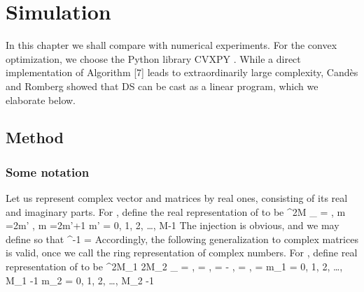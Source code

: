 \chapter {Simulation}

In this chapter we shall compare  with numerical experiments.
For the convex optimization, we choose the Python library CVXPY \cite {DiB16}.
While a direct implementation of Algorithm [7] leads to extraordinarily large complexity, Candès and Romberg \cite {CaR05} showed that DS can be cast as a linear program, which we elaborate below.

\section {Method}

\subsection {Some notation}

Let us represent complex vector and matrices by real ones, consisting of its real and imaginary parts.
For , define the real representation  of  to be
%
 {
 
\in {} ^{2M} \NR
{}  _{}
= \startcases
{} , \MC m =2m' \NR
{} , \MC m =2m'+1 \NR
\stopcases \NR
m' 
=  0, 1, 2, \ldots, M-1 \NR
}
%
The injection is obvious, and we may define  so that
%
 {
 ^{-1} 
= \NR
}
%
Accordingly, the following generalization to complex matrices is valid, once we call the ring representation of complex numbers.
For , define real representation  of  to be
%
 {
 
\in {} ^{2M_1 \D 2M_2} \NR
{}  _{} =
\startcases
{} , \MC {} =  \NR
{} , \MC {} =  \NR
- , \MC {} =  \NR
{} , \MC {} =  \NR
\stopcases \NR
m_1 
= 0, 1, 2, \ldots, M_1 -1 \NR
m_2 
= 0, 1, 2, \ldots, M_2 -1 \NR
}

